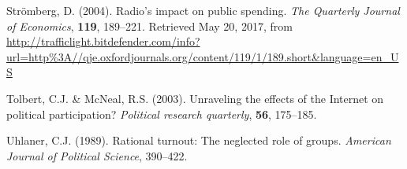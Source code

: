 \documentclass[
  12pt,
]{article}
\begin{document}
\leavevmode\hypertarget{ref-stromberg_radios_2004}{}%
Strömberg, D. (2004). Radio's impact on public spending. \emph{The
Quarterly Journal of Economics}, \textbf{119}, 189--221. Retrieved May
20, 2017, from
\url{http://trafficlight.bitdefender.com/info?url=http\%3A//qje.oxfordjournals.org/content/119/1/189.short\&language=en_US}

\leavevmode\hypertarget{ref-tolbert_unraveling_2003}{}%
Tolbert, C.J. \& McNeal, R.S. (2003). Unraveling the effects of the
Internet on political participation? \emph{Political research
quarterly}, \textbf{56}, 175--185.

\leavevmode\hypertarget{ref-uhlaner_rational_1989}{}%
Uhlaner, C.J. (1989). Rational turnout: The neglected role of groups.
\emph{American Journal of Political Science}, 390--422.
\end{document}
